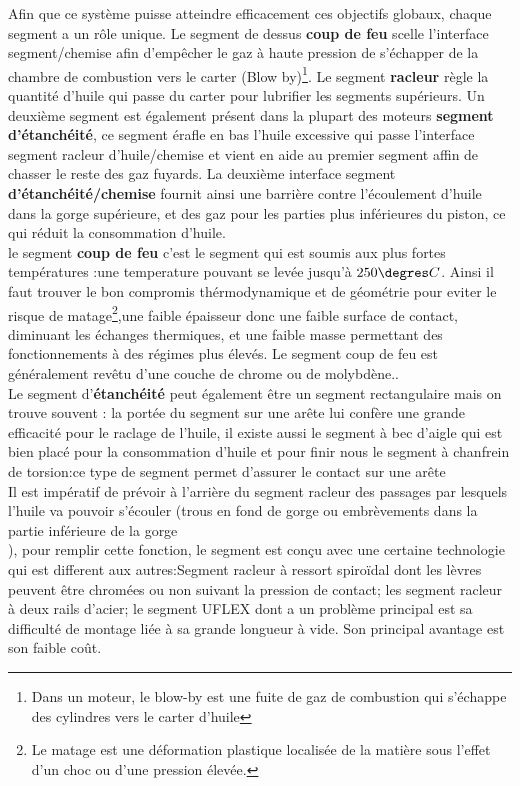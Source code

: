 Afin que ce système puisse atteindre efficacement ces objectifs globaux, chaque segment a un rôle unique. Le segment de dessus \textbf{coup de feu} scelle l'interface segment/chemise afin d'empêcher le gaz à haute pression de s'échapper de la chambre de combustion vers le carter (Blow by)\footnote{Dans un moteur, le blow-by est une fuite de gaz de combustion qui s'échappe des cylindres vers le carter d'huile}. Le segment \textbf{racleur} règle la quantité d'huile qui passe du carter pour lubrifier les segments supérieurs. Un deuxième segment est également présent dans la plupart des moteurs \textbf{segment d’étanchéité}, ce segment érafle en bas l'huile excessive qui passe l'interface segment racleur d'huile/chemise et vient en aide au premier segment affin de chasser le reste des gaz fuyards. La deuxième interface segment \textbf{d’étanchéité/chemise} fournit ainsi une barrière contre l'écoulement d'huile dans la gorge supérieure, et des gaz pour les parties plus inférieures du piston, ce qui réduit la consommation d’huile. \cite{ayad1}\\

le segment \textbf{coup de feu} c’est le segment qui est soumis aux plus fortes températures :une temperature pouvant se levée jusqu'à $250\degres C$. Ainsi il faut trouver le bon compromis thérmodynamique et de géométrie pour eviter le risque de matage\footnote{Le matage est une déformation plastique localisée de la matière sous l'effet d'un choc ou d'une pression élevée.},une faible épaisseur donc une faible surface de contact, diminuant les échanges thermiques, et une faible masse permettant des fonctionnements à des régimes plus élevés. Le segment coup de feu est généralement revêtu d’une couche de chrome ou de molybdène.\cite{technologie1}.\\

Le segment d’\textbf{étanchéité} peut également être un segment rectangulaire mais on trouve souvent : la portée du segment sur une arête lui confère une grande efficacité pour le raclage de l’huile, il existe aussi le segment à bec d’aigle qui est bien placé pour la consommation d'huile et pour finir nous le segment à chanfrein de torsion:ce type de segment permet d’assurer le contact sur une arête\cite{technologie1}\\

Il est impératif de prévoir à l’arrière du segment racleur des passages par lesquels l’huile va pouvoir s’écouler (trous en fond de gorge ou embrèvements dans la partie inférieure de la gorge\\), pour remplir cette fonction, le segment est conçu avec une certaine technologie qui est different aux autres:Segment racleur à ressort spiroïdal dont les lèvres peuvent être chromées ou non suivant la pression de contact; les segment racleur à deux rails d’acier; le segment UFLEX dont a un problème principal  est sa difficulté de montage liée à sa grande longueur à vide. Son principal avantage est son faible coût. \cite{technologie1}\\

